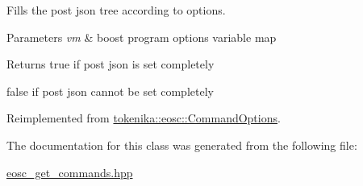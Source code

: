 Fills the post json tree according to options. 


\begin{DoxyParams}{Parameters}
{\em vm} & boost program options variable map \\
\hline
\end{DoxyParams}
\begin{DoxyReturn}{Returns}
true if post json is set completely 

false if post json cannot be set completely 
\end{DoxyReturn}


Reimplemented from \hyperlink{classtokenika_1_1eosc_1_1_command_options_a7aecc9aa79ca65f6abbd568ff8ff77a7}{tokenika\+::eosc\+::\+Command\+Options}.



The documentation for this class was generated from the following file\+:\begin{DoxyCompactItemize}
\item 
\hyperlink{eosc__get__commands_8hpp}{eosc\+\_\+get\+\_\+commands.\+hpp}\end{DoxyCompactItemize}
